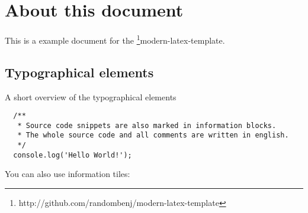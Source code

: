 \documentclass[oneside]{modern}
\begin{document}
  \section*{About this document}

  This is a example document for the
  \footnote{http://github.com/randombenj/modern-latex-template}{modern-latex-template}.

  \subsection*{Typographical elements}

  A short overview of the typographical elements

  \begin{verbatim}
  /**
   * Source code snippets are also marked in information blocks.
   * The whole source code and all comments are written in english.
   */
  console.log('Hello World!');
  \end{verbatim}

  You can also use information tiles:

\end{document}

